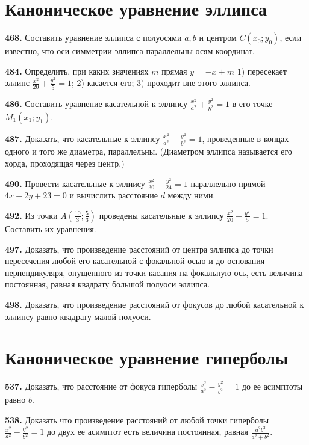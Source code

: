 \section{Каноническое уравнение эллипса}


\textbf{468.} Составить уравнение эллипса с полуосями $a, b$ и центром $C\left(x_0 ; y_0\right)$, если известно, что оси симметрии эллипса параллельны осям координат.

\textbf{484.} Определить, при каких значениях $m$ прямая $y=-x+m$ 1) пересекает эллипс $\frac{x^2}{20}+\frac{y^2}{5}=1$; 2) касается его; 3) проходит вне этого эллипса.

\textbf{486.} Составить уравнение касательной к эллипсу $\frac{x^2}{a^2}+\frac{y^2}{b^2}=1$ в его точке $M_1\left(x_1 ; y_1\right)$.

\textbf{487.} Доказать, что касательные к эллипсу $\frac{x^2}{a^2}+\frac{y^2}{b^2}=1$, проведенные в концах одного и того же диаметра, параллельны. (Диаметром эллипса называется его хорда, проходящая через центр.)

\textbf{490.} Провести касательные к эллиису $\frac{x^2}{30}+\frac{y^2}{24}=1$ параллельно прямой $4 x-2 y+23=0$ и вычислить расстояние $d$ между ними.

\textbf{492.} Из точки $A\left(\frac{10}{3} ; \frac{5}{3}\right)$ проведены касательные к эллипсу $\frac{x^2}{20}+\frac{y^2}{5}=1$. Составить их уравнения.

\textbf{497.} Доказать, что произведение расстояний от центра эллипса до точки пересечения любой его касательной с фокальной осью и до основания перпендикуляря, опущенного из точки касания на фокальную ось, есть величина постоянная, равная квадрату большой полуоси эллипса.

\textbf{498.} Доказать, что произведение расстояний от фокусов до любой касательной к эллипсу равно квадрату малой полуоси.



\section{Каноническое уравнение гиперболы}



\textbf{537.} Доказать, что расстояние от фокуса гиперболы $\frac{x^2}{a^2}-\frac{y^2}{b^2}=1$ до ее асимптоты равно $b$.

\textbf{538.} Доказать что произведение расстояний от любой точки гиперболы $\frac{x^2}{a^2}-\frac{y^2}{b^2}=1$ до двух ее асимптот есть величина постоянная, равная $\frac{a^2 b^2}{a^2+b^2}$.

